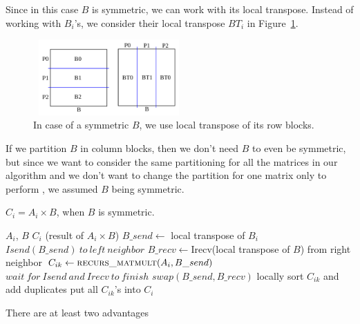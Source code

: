 Since in this case $B$ is symmetric, we can work with its local transpose. Instead of working with $B_i$'s, we consider their local transpose $BT_i$ in Figure~\ref{fig:partition4}.

\begin{figure}[tbh]
    \centering
    \includegraphics[width=5.8cm,height=2.9cm]{./figures/partition4.pdf}
    \caption{In case of a symmetric $B$, we use local transpose of its row blocks.}
    \label{fig:partition4}
    \Description{}
\end{figure}

If we partition $B$ in column blocks, then we don't need $B$ to even be symmetric, but since we want to consider the same partitioning for all the matrices in our algorithm and we don't want to change the partition for one matrix only to perform \recmm, we assumed $B$ being symmetric.

\begin{algorithm}[H] 
  \caption{$C_i = A_i \times B$, when $B$ is symmetric.}
  \begin{algorithmic}[1]
    \Require $A_i$, $B$
    \Ensure  $C_i$ (result of $A_i \times B$)
    \State $B\_send \leftarrow$ local transpose of $B_i$
      \State $Isend(B\_send)\ to\ left\ neighbor$
      \State $B\_recv \leftarrow$Irecv(local transpose of $B$) from right neighbor
      \State $C_{ik} \leftarrow \textsc{recurs\_matmult}(A_i, B\_send)$ 
      \State $wait\ for\ Isend\ and\ Irecv\ to\ finish$
      \State $swap(B\_send,B\_recv)$
      \State locally sort $C_{ik}$ and add duplicates
    \EndFor
    \State put all $C_{ik}$'s into $C_i$
  \end{algorithmic}
  \label{alg:comm2} 
\end{algorithm}

There are at least two advantages 
